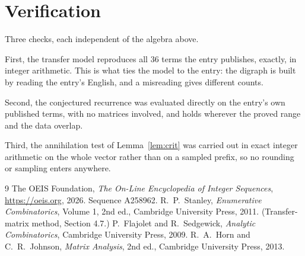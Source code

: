 \documentclass[11pt,a4paper]{article}
\theoremstyle{plain}
\theoremstyle{definition}
\begin{document}
\section{Verification}

Three checks, each independent of the algebra above.

First, the transfer model reproduces all $36$ terms the entry publishes, exactly, in
integer arithmetic. This is what ties the model to the entry: the digraph is built by reading
the entry's English, and a misreading gives different counts.

Second, the conjectured recurrence was evaluated directly on the entry's own published terms,
with no matrices involved, and holds wherever the proved range and the data overlap.

Third, the annihilation test of Lemma~\ref{lem:crit} was carried out in exact integer
arithmetic on the whole vector rather than on a sampled prefix, so no rounding or sampling
enters anywhere.

\begin{thebibliography}{9}
 The OEIS Foundation, \emph{The On-Line Encyclopedia of Integer
Sequences}, \url{https://oeis.org}, 2026. Sequence A258962.
 R.~P.~Stanley, \emph{Enumerative Combinatorics}, Volume 1, 2nd ed.,
Cambridge University Press, 2011. (Transfer-matrix method, Section 4.7.)
 P.~Flajolet and R.~Sedgewick, \emph{Analytic Combinatorics}, Cambridge
University Press, 2009.
 R.~A.~Horn and C.~R.~Johnson, \emph{Matrix Analysis}, 2nd ed., Cambridge
University Press, 2013.
\end{thebibliography}
\end{document}

